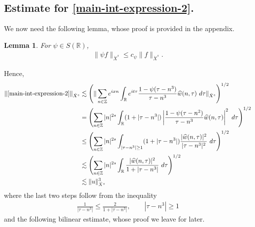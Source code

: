 \documentclass[12pt,reqno]{amsart}
\numberwithin{equation}{section}  %
\numberwithin{figure}{section}
\newcommand{\rr}{\mathbb{R}}
\newcommand{\zz}{\mathbb{Z}}
\newcommand{\wh}{\widehat}
\theoremstyle{plain}
\newtheorem{lemma}{Lemma}
\theoremstyle{definition}
\theoremstyle{remark}
\begin{document}
\subsection{Estimate for \eqref{main-int-expression-2}.}
We now need the following lemma, whose proof is provided in the appendix.
%
%
%
%
%
%
%
%
\begin{lemma}
\label{lem:schwartz-mult}
	For $\psi \in S(\rr)$,
%
%
\begin{equation}
	\label{schwartz-mult}
	\begin{split}
		\|\psi f \|_{\dot{X}^s} \le c_{\psi} \|f \|_{\dot{X}^s}.
	\end{split}
\end{equation}
%
%
\end{lemma}
%
%
Hence,
%
%
\begin{equation}
	\label{main-int2-est-X-s-part}
	\begin{split}
		\|\eqref{main-int-expression-2}\|_{\dot{X}^s} 
		& \lesssim 
		\left( \| \sum_{n \in \zz} e^{ixn} \int_\rr 
		e^{it \tau} \frac{ 1 - \psi (\tau - n^{3} ) 
		}{\tau - n^{3}} \wh{w}(n, \tau) \ 
		d \tau\|_{\dot{X}^s} \right)^{1/2}
		\\
		& =  \left( \sum_{n \in \zz} |n|^{2s} \int_\rr
		(1 + |\tau - n^{3}|) \left | \frac{1 - \psi(\tau - n^{2 
		})}{\tau - n^{3}} 
		\wh{w}(n, \tau) \right |^2 \ d 
		\tau \right)^{1/2}
		\\
		& \le \left( \sum_{n \in \zz} |n|^{2s} \int_{| \tau - n^3| \ge 1}
		(1 + |\tau - n^{3}|) \frac{|\wh{w}(n, \tau)|^2 }{|\tau - n^3|^2} 
		\ d 
		\tau \right)^{1/2}
		\\
		& \lesssim  \left( \sum_{n \in 
		\zz} |n|^{2s} \int_\rr
		\frac{|\wh{w}(n, \tau) |^2}{1+ |\tau - 
		n^{3}|} 
		 \ d \tau 
		\right)^{1/2}
		\\
		& \lesssim  \|u\|_{\dot{X}^s}^3
	\end{split}
\end{equation}
%
%
where the last two steps follow from the inequality 
%
\begin{equation}
	\label{one-plus-ineq}
	\begin{split}
		\frac{1}{|\tau - n^{3}| } \le \frac{2}{1 + |\tau - n^{3}| }, 
		\qquad |\tau - n^{3}| \ge 1
	\end{split}
\end{equation}
%
%
and the following bilinear estimate, whose proof we leave for later.
%
\end{document}
